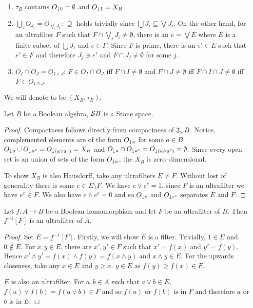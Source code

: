 \begin{enumerate}[label=(T\arabic*)]
    \item $\tau_B$ contains $O_{\mathord{\downarrow}\mkern1mu 0} = \emptyset$ and $O_{\mathord{\downarrow}\mkern1mu 1} = X_B$.

    \item $\bigcup_i O_{J_i} = O_{\bigvee_i J_i}$: $\supseteq$ holds trivially since $\bigcup J_i \subseteq \bigvee J_i$. On the other hand, for an ultrafilter $F$ such that $F\cap \bigvee_i J_i \neq \emptyset$, there is an $e = \bigvee E$ where $E$ is a finite subset of $\bigcup J_i$ and $e \in F$. Since $F$ is prime, there is an $e' \in E$ such that $e' \in F$ and therefore $J_j \ni e'$ and $F\cap J_j \neq \emptyset$ for some $j$.

    \item $O_I \cap O_J = O_{I\wedge J}$: $F \in O_I\cap O_J$ iff $F\cap I \neq \emptyset$ and $F\cap J \neq \emptyset$ iff $F \cap I \cap J \neq \emptyset$ iff $F\in O_{I\cap J}$.
\end{enumerate}

\noindent We will denote  to be $(X_B, \tau_B)$.

\begin{lemma}\label{p:SpObjects}
    Let $B$ be a Boolean algebra, $\mathcal{S} B$ is a Stone space.
\end{lemma}
\begin{proof}
    Compactness follows directly from compactness of $\mathfrak{J}_{\omega} B$. Notice, complemented elements are of the form $O_{\mathord{\downarrow}\mkern1mu a}$ for some $a\in B$: $O_{\mathord{\downarrow}\mkern1mu a}\cup O_{\mathord{\downarrow}\mkern1mu a^c} = O_{\mathord{\downarrow}\mkern1mu (a\vee a^c)} = X_B$ and $O_{\mathord{\downarrow}\mkern1mu a}\cap O_{\mathord{\downarrow}\mkern1mu a^c} = O_{\mathord{\downarrow}\mkern1mu (a\wedge a^c)} = \emptyset$. Since every open set is an union of sets of the form $O_{\mathord{\downarrow}\mkern1mu a}$, the $X_B$ is zero--dimensional.

    To show $X_B$ is also Hausdorff, take any ultrafilters $E \neq F$. Without lost of generality there is some $e \in E \setminus F$. We have $e\vee e^c = 1$, since $F$ is an ultrafilter we have $e^c \in F$. We also have $e\wedge e^c = 0$ and so $O_{\mathord{\downarrow}\mkern1mu e}$ and $O_{\mathord{\downarrow}\mkern1mu e^c}$ separates $E$ and $F$.
\end{proof}

\begin{lemma}
    Let $f\colon A \to B$ be a Boolean homomorphism and let $F$ be an ultrafilter of $B$. Then $f^{-1}[F]$ is an ultrafilter of $A$.
\end{lemma}
\begin{proof}
    Set $E = f^{-1}[F]$. Firstly, we will show $E$ is a filter. Trivially, $1 \in E$ and $0 \not\in E$. For $x, y \in E$, there are $x', y' \in F$ such that $x' = f(x)$ and $y' = f(y)$. Hence $x'\wedge y' = f(x) \wedge f(y) = f(x\wedge y)$ and $x\wedge y \in E$. For the upwards closeness, take any $x \in E$ and $y \geq x$. $y \in E$ as $f(y) \geq f(x) \in F$.

    $E$ is also an ultrafilter. For $a, b\in A$ such that $a\vee b \in E$, $f(a)\vee f(b) = f(a\vee b) \in F$ and so $f(a)$ or $f(b)$ is in $F$ and therefore $a$ or $b$ is in $E$.
\end{proof}

